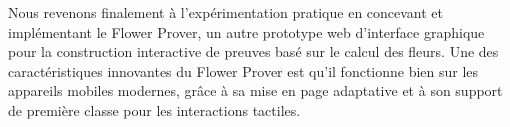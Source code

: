 Nous revenons finalement à l'expérimentation pratique en concevant et
implémentant le Flower Prover, un autre prototype web d'interface graphique pour
la construction interactive de preuves basé sur le calcul des fleurs. Une des
caractéristiques innovantes du Flower Prover est qu'il fonctionne bien sur les
appareils mobiles modernes, grâce à sa mise en page adaptative et à son support
de première classe pour les interactions tactiles.